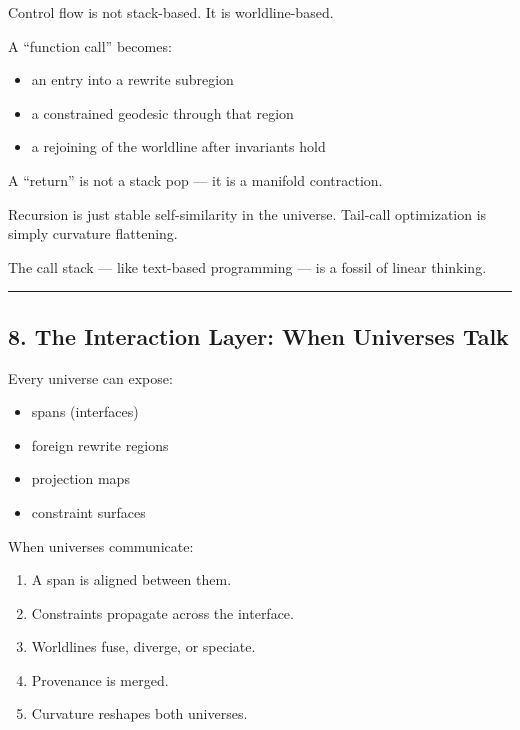 Control flow is not stack-based. It is worldline-based.

A ``function call'' becomes:

\begin{itemize}
\tightlist
\item
  an entry into a rewrite subregion
\item
  a constrained geodesic through that region
\item
  a rejoining of the worldline after invariants hold
\end{itemize}

A ``return'' is not a stack pop --- it is a manifold contraction.

Recursion is just stable self-similarity in the universe. Tail-call
optimization is simply curvature flattening.

The call stack --- like text-based programming --- is a fossil of linear
thinking.

\begin{center}\rule{0.5\linewidth}{0.5pt}\end{center}

\subsection{8. The Interaction Layer: When Universes
Talk}\label{the-interaction-layer-when-universes-talk}

Every universe can expose:

\begin{itemize}
\tightlist
\item
  spans (interfaces)
\item
  foreign rewrite regions
\item
  projection maps
\item
  constraint surfaces
\end{itemize}

When universes communicate:

\begin{enumerate}
\def\labelenumi{\arabic{enumi}.}
\tightlist
\item
  A span is aligned between them.
\item
  Constraints propagate across the interface.
\item
  Worldlines fuse, diverge, or speciate.
\item
  Provenance is merged.
\item
  Curvature reshapes both universes.
\end{enumerate}

